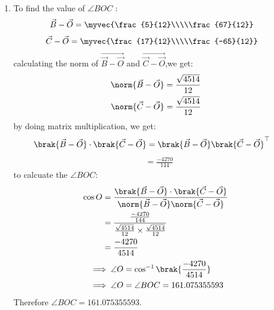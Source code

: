 \documentclass[journal,12pt,twocolumn]{IEEEtran}
\theoremstyle{remark}
\begin{document}
\begin{enumerate}
	\item To find  the value of $\angle{BOC}$ :
\begin{align}
\Vec{B}-\Vec{O}
          &=\myvec{\frac{5}{12}\\\\\frac{67}{12}}
\end{align}
\vspace{0.1cm}
\begin{align}
\Vec{C}-\Vec{O}
          &=\myvec{\frac{17}{12}\\\\\frac{-65}{12}}
\end{align}
\vspace{0.1cm}
calculating the norm of $\Vec{\Vec{B}-\Vec{O}}$ and $\Vec{\Vec{C}-\Vec{O}}$,we get:
\begin{align}
	\norm{\Vec{B}-\Vec{O}}&= \frac{\sqrt{4514}}{12}\\
	\norm{\Vec{C}-\Vec{O}}&= \frac{\sqrt{4514}}{12}
\end{align}
\vspace{0.2cm}
by doing matrix multiplication, we get:
\begin{align}
\brak{\Vec{B}-\Vec{O}}\cdot\brak{\Vec{C}-\Vec{O}}&=\brak{\Vec{B}-\Vec{O}}\brak{\Vec{C}-\Vec{O}}^{\top}
\end{align}
\begin{align}
&=\frac{-4270}{144}
\end{align}
\vspace{0.2cm}
to calcuate the $\angle{BOC}$:
\begin{align}
\cos{O}&=\frac{\brak{\Vec{B}-\Vec{O}}\cdot\brak{\Vec{C}-\Vec{O}}}{\norm{\Vec{B}-\Vec{O}}\norm{\Vec{C}-\Vec{O}}}\\
&=\frac{\frac{-4270}{144}}{\frac{\sqrt{4514}}{12}\times\frac{\sqrt{4514}}{12}}\\
&=\frac{-4270}{4514}
\end{align}
\vspace{0.1cm}
\begin{align}
&\implies\angle{O}=\cos^{-1}\brak{\frac{-4270}{4514}}\\
&\implies\angle{O}=\angle{BOC}=161.075355593
\end{align}
\vspace{0.4cm}
Therefore $\angle{BOC}=161.075355593$.
\vspace{0.25cm}







\end{enumerate}
\end{document}
